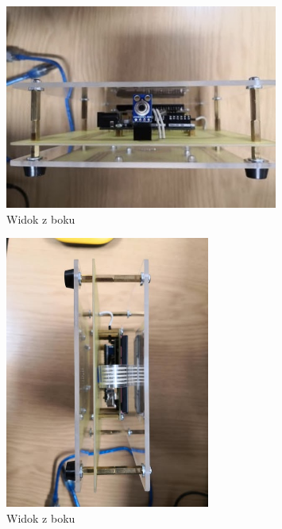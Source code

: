 \begin{figure}[h!]
    \centering
    \includegraphics[width=0.8\textwidth]{images/bok3.jpg}
    \caption{Widok z boku}
    \label{fig:panel_gorny}
\end{figure}

\begin{figure}[h!]
    \centering
    \includegraphics[width=0.6\textwidth]{images/bok4.jpg}
    \caption{Widok z boku}
    \label{fig:panel_gorny}
\end{figure}

